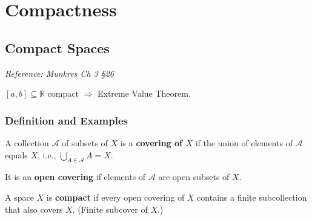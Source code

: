 \documentclass[11pt]{report}
\begin{document}
\chapter{Compactness}

\section{Compact Spaces}

\textit{Reference: Munkres Ch 3 \S 26}

$[a, b] \subseteq \mathbb{R}$ compact $\Rightarrow$ Extreme Value Theorem.

\subsection{Definition and Examples}

\begin{defbox}[Covering]
A collection $\mathcal{A}$ of subsets of $X$ is a \textbf{covering of $X$} if the union of elements of $\mathcal{A}$ equals $X$, i.e., $\bigcup_{A \in \mathcal{A}} A = X$.

It is an \textbf{open covering} if elements of $\mathcal{A}$ are open subsets of $X$.
\end{defbox}

\begin{defbox}[Compact]
A space $X$ is \textbf{compact} if every open covering of $X$ contains a finite subcollection that also covers $X$. (Finite subcover of $X$.)
\end{defbox}
\end{document}

